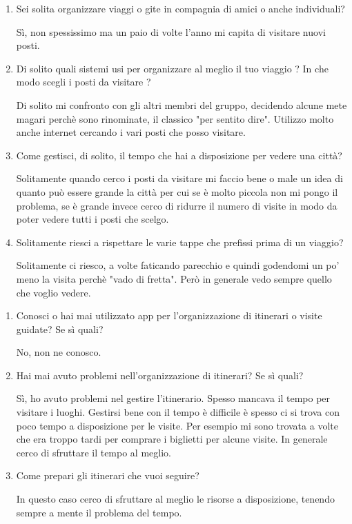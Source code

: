 \begin{enumerate}

\item Sei solita organizzare viaggi o gite in compagnia di amici o anche individuali?

Sì, non spessissimo ma un paio di volte l'anno mi capita di visitare nuovi posti.

\item Di solito quali sistemi usi per organizzare al meglio il tuo viaggio ? In che modo scegli i posti da visitare ?

Di solito mi confronto con gli altri membri del gruppo, decidendo alcune mete magari perchè sono rinominate, il classico "per sentito dire". Utilizzo molto anche internet cercando i vari posti che posso visitare.

\item Come gestisci, di solito, il tempo che hai a disposizione per vedere una città?

Solitamente quando cerco i posti da visitare mi faccio bene o male un idea di quanto può essere grande la città per cui se è molto piccola non mi pongo il problema, se è grande invece cerco di ridurre il numero di visite in modo da poter vedere tutti i posti che scelgo.

\item Solitamente riesci a rispettare le varie tappe che prefissi prima di un viaggio?

Solitamente ci riesco, a volte faticando parecchio e quindi godendomi un po' meno la visita perchè "vado di fretta". Però in generale vedo sempre quello che voglio vedere.

\end{enumerate}

\clearpage
{}

\begin{enumerate}

\item Conosci o hai mai utilizzato app per l'organizzazione di itinerari o visite guidate? Se sì quali?

No, non ne conosco.

\item Hai mai avuto problemi nell'organizzazione di itinerari? Se sì quali?

Sì, ho avuto problemi nel gestire l'itinerario. Spesso mancava il tempo per visitare i luoghi. Gestirsi bene con il tempo è difficile è spesso ci si trova con poco tempo a disposizione per le visite. Per esempio mi sono trovata a volte che era troppo tardi per comprare i biglietti per alcune visite. In generale cerco di sfruttare il tempo al meglio.

\item Come prepari gli itinerari che vuoi seguire?

In questo caso cerco di sfruttare al meglio le risorse a disposizione, tenendo sempre a mente il problema del tempo.

\end{enumerate}

